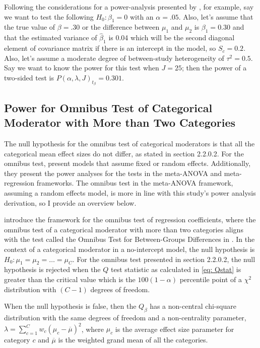 Following the considerations for a power-analysis presented by \textcite{hedges2004}, for example, say we want to test the following $H_0: \beta_1 = 0$ with an $\alpha = .05$. Also, let's assume that the true value of $\beta = .30$ or the difference between $\mu_1$ and $\mu_2$ is $\beta_1 = 0.30$ and that the estimated variance of $\hat{\beta}_1$ is 0.04 which will be the second diagonal element of covariance matrix if there is an intercept in the model, so $S_c = 0.2$. Also, let's assume a moderate degree of between-study heterogeneity of $\tau^2 = 0.5$. Say we want to know the power for this test when $J=25$; then the power of a two-sided test is $ P(\alpha, \lambda, J)_{t_{\beta}}  = 0.301$.


\subsection{Power for Omnibus Test of Categorical Moderator with More than Two Categories}

The null hypothesis for the omnibus test of categorical moderators is that all the categorical mean effect sizes do not differ, as stated in section 2.2.0.2. For the omnibus test, \textcite{hedges2004} present models that assume fixed or random effects. Additionally, they present the power analyses for the tests in the meta-ANOVA and meta-regression frameworks. The omnibus test in the meta-ANOVA framework, assuming a random effects model, is more in line with this study's power analysis derivation, so I provide an overview below.

\textcite{hedges2004} introduce the framework for the omnibus test of regression coefficients, where the omnibus test of a categorical moderator with more than two categories aligns with the test called the Omnibus Test for Between-Groups Differences in \textcite{hedges2004}. In the context of a categorical moderator in a no-intercept model, the null hypothesis is $H_0: \mu_{1} = \mu_{2} = \hdots = \mu_{C}$. For the omnibus test presented in section 2.2.0.2, the null hypothesis is rejected when the $Q$ test statistic as calculated in \ref{eq: Qstat} is greater than the critical value which is the $100(1-\alpha)$ percentile point of a $\chi^2$ distribution with $(C-1)$ degrees of freedom. 

When the null hypothesis is false, then the $Q_{\beta}$ has a non-central chi-square distribution with the same degrees of freedom and a non-centrality parameter, $\lambda = \sum_{c=1}^C w_c(\mu_{c} - \overline{\mu})^2$, where  $\mu_{c}$ is the average effect size parameter for category $c$ and $ \overline{\mu}$ is the weighted grand mean of all the categories. 

